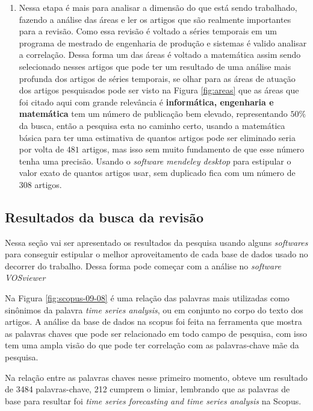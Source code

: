 \begin{enumerate}[start=1, label = {\textbf{Etapa} \arabic* } ]
\item  \label{etp:rev-4}Nessa etapa é mais para analisar a dimensão do que está sendo trabalhado, fazendo a análise das áreas e ler os artigos que são realmente importantes para a revisão. Como essa revisão é voltado a séries temporais em um programa de mestrado de engenharia de produção e sistemas é valido analisar a correlação. Dessa forma um das áreas é voltado a matemática assim sendo selecionado nesses artigos que pode ter um resultado de uma análise mais profunda dos artigos de séries temporais, se olhar para as áreas de atuação dos artigos pesquisados pode ser visto na Figura \ref{fig:areas} que as áreas que foi citado aqui com grande relevância é \textbf{informática, engenharia e matemática} tem um número de publicação bem elevado, representando $50\%$ da busca, então a pesquisa esta no caminho certo, usando a matemática básica para ter uma estimativa de quantos artigos pode ser eliminado seria por volta de $481$ artigos, mas isso sem muito fundamento de que esse número tenha uma precisão. Usando o \textit{software mendeley desktop}  para estipular o valor exato de quantos artigos usar, sem duplicado fica com um número de $308$ artigos.
\end{enumerate}

\subsection{Resultados da busca da revisão}\label{subesec:resul da revisão}


Nessa seção vai ser apresentado os resultados da pesquisa usando alguns \textit{softwares} para conseguir estipular o melhor aproveitamento de cada base de dados usado no decorrer do trabalho. Dessa forma pode começar com a análise no \textit{software VOSviewer} 


Na Figura \ref{fig:scopus-09-08} é uma relação das palavras mais utilizadas como sinônimos da palavra \textit{time series analysis}, ou em conjunto no corpo do texto dos artigos.
A análise da base de dados na scopus foi feita na ferramenta que mostra as palavras chaves que pode ser relacionado em todo campo de pesquisa, com isso tem uma ampla visão do que pode ter correlação com as palavras-chave mãe da pesquisa.

Na relação entre as palavras chaves nesse primeiro momento, obteve um resultado de 3484 palavras-chave, 212 cumprem o limiar, lembrando que as palavras de base para resultar foi \textit{time series forecasting and time series analysis } na Scopus.


